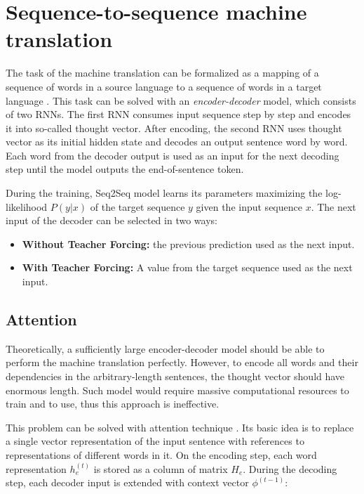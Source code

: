 \section{Sequence-to-sequence machine translation} \label{seq2seq}
The task of the machine translation can be formalized as a mapping of a sequence of words in a source language to a sequence of words in a target language \parencite{Neubig2017}. This task can be solved with an \emph{encoder-decoder} model, which consists of two RNNs. The first RNN consumes input sequence step by step and encodes it into so-called thought vector. After encoding, the second RNN uses thought vector as its initial hidden state and decodes an output sentence word by word.  Each word from the decoder output is used as an input for the next decoding step until the model outputs the end-of-sentence token. 

During the training, Seq2Seq model learns its parameters maximizing the log-likelihood $P(y|x)$ of the target sequence $y$ given the input sequence $x$. The next input of the decoder can be selected in two ways:
    \begin{itemize}
    	\item \textbf{Without Teacher Forcing:} the previous prediction used as the next input.
    	\item \textbf{With Teacher Forcing:} A value from the target sequence used as the next input.
    \end{itemize}


\subsection{Attention} \label{attention}
Theoretically, a sufficiently large encoder-decoder model should be able to perform the machine translation perfectly. However, to encode all words and  their dependencies in the arbitrary-length sentences, the thought vector should have enormous length. Such model would require massive computational resources to train and to use, thus this approach is ineffective.

This problem can be solved with attention technique \parencite{Bahdanau2014}. Its basic idea is to replace a single vector representation of the  input sentence with references to representations of different words in it. On the encoding step, each word representation $h_e^{(t)}$ is stored as a column of matrix $H_e$. During the decoding step, each decoder input is extended with context vector $\phi^{(t-1)}$:


